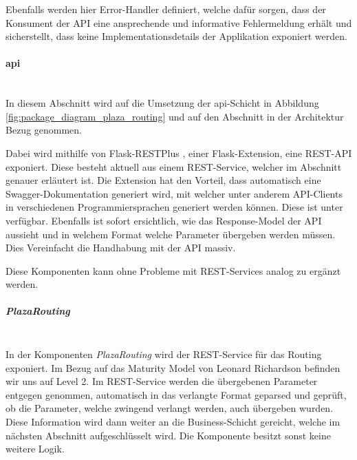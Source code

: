 Ebenfalls werden hier Error-Handler definiert, welche dafür sorgen, dass der Konsument der \ac{API} eine ansprechende und informative Fehlermeldung erhält und sicherstellt, dass keine Implementationsdetails der Applikation exponiert werden.

\paragraph{api}\label{impl:Plaza Routing api}~\\
In diesem Abschnitt wird auf die Umsetzung der api-Schicht in Abbildung \ref{fig:package_diagram_plaza_routing} und auf den Abschnitt  in der Architektur Bezug genommen.

Dabei wird mithilfe von Flask-RESTPlus \cite{flask-restplus}, einer Flask-Extension, eine \ac{REST}-\ac{API} exponiert. Diese besteht aktuell aus einem \ac{REST}-Service, welcher im Abschnitt  genauer erläutert ist. Die Extension hat den Vorteil, dass automatisch eine Swagger-Dokumentation \cite{swagger} generiert wird, mit welcher unter anderem \ac{API}-Clients in verschiedenen Programmiersprachen generiert werden können. Diese ist unter \cite{plaza-routing-api-swaggerui} verfügbar. Ebenfalls ist sofort ersichtlich, wie das Response-Model der \ac{API} aussieht und in welchem Format welche Parameter übergeben werden müssen. Dies Vereinfacht die Handhabung mit der \ac{API} massiv.

Diese Komponenten kann ohne Probleme mit \ac{REST}-Services analog zu  ergänzt werden.

\subparagraph{PlazaRouting}\label{impl:PlazaRouting}~\\
In der Komponenten \emph{PlazaRouting} wird der \ac{REST}-Service für das Routing exponiert. Im Bezug auf das Maturity Model \cite{maturity_model} von Leonard Richardson befinden wir uns auf Level 2. Im \ac{REST}-Service werden die übergebenen Parameter entgegen genommen, automatisch in das verlangte Format geparsed und geprüft, ob die Parameter, welche zwingend verlangt werden, auch übergeben wurden. Diese Information wird dann weiter an die Business-Schicht gereicht, welche im nächsten Abschnitt aufgeschlüsselt wird. Die Komponente besitzt sonst keine weitere Logik.

